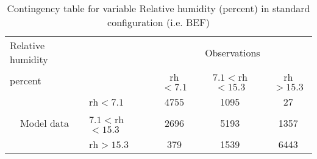 
\begin{table}[]
\begin{center}
\begin{tabular}{llccc}
\hline
{Relative humidity}                                       &                                                    & \multicolumn{3}{c}{Observations}                 \\
{percent}                                       &                             & rh$<7.1$   & $7.1<$rh$<15.3$ & rh$>15.3$ \\
\hline
\multicolumn{1}{c}{\multirow{3}{*}{Model data}}  & rh$<7.1$          & 4755                & 1095                       & 27              \\
                                                 & $7.1<$rh$<15.3$ & 2696                & 5193                       & 1357              \\
                                                 & rh$>15.3$          & 379                & 1539                       & 6443              \\
\hline
\end{tabular}
\end{center}
\caption{Contingency table for variable Relative humidity (percent) in standard configuration (i.e. BEF)}
\label{tab:contingency}
\end{table}
